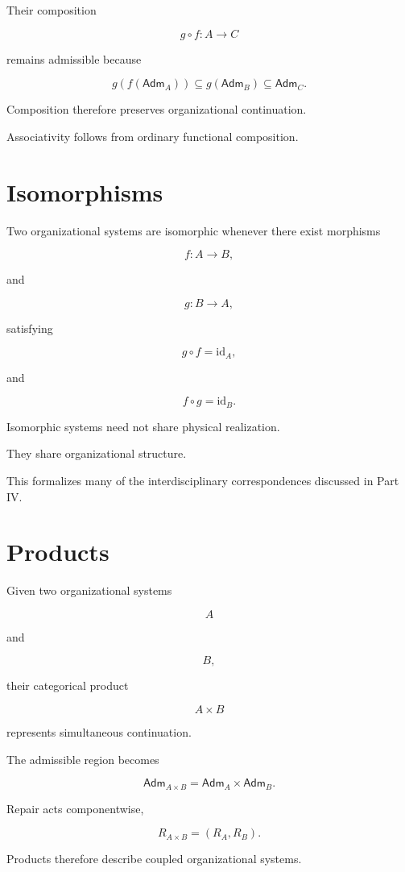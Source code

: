 \documentclass[11pt,oneside]{book}
\numberwithin{equation}{chapter}
\theoremstyle{definition}
\theoremstyle{plain}
\newcommand{\Adm}{\mathsf{Adm}}
\begin{document}
Their composition

\[
g
\circ
f
:
A
\rightarrow
C
\]

remains admissible because

\[
g
(f(\Adm_A))
\subseteq
g(\Adm_B)
\subseteq
\Adm_C.
\]

Composition therefore preserves organizational continuation.

Associativity follows from ordinary functional composition.

\section{Isomorphisms}

Two organizational systems are isomorphic whenever there exist morphisms

\[
f
:
A
\rightarrow
B,
\]

and

\[
g
:
B
\rightarrow
A,
\]

satisfying

\[
g
\circ
f
=
\mathrm{id}_A,
\]

and

\[
f
\circ
g
=
\mathrm{id}_B.
\]

Isomorphic systems need not share physical realization.

They share organizational structure.

This formalizes many of the interdisciplinary correspondences discussed in
Part IV.

\section{Products}

Given two organizational systems

\[
A
\]

and

\[
B,
\]

their categorical product

\[
A
\times
B
\]

represents simultaneous continuation.

The admissible region becomes

\[
\Adm_{A\times B}
=
\Adm_A
\times
\Adm_B.
\]

Repair acts componentwise,

\[
R_{A\times B}
=
(R_A,R_B).
\]

Products therefore describe coupled organizational systems.
\end{document}
